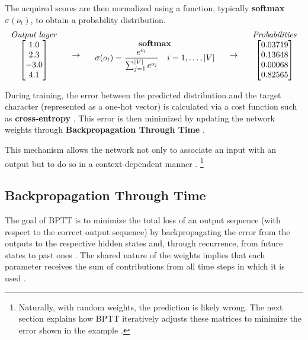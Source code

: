 The acquired scores are then normalized using a function, typically \textbf{softmax} $\sigma(o_t)$, to obtain a probability distribution. 
\[
\begin{array}{c}
\text{\textit{Output layer}} \\
\begin{bmatrix} 1.0 \\ 2.3 \\ -3.0 \\ 4.1 \end{bmatrix}
\end{array}
\quad \rightarrow \quad
\begin{array}{c}
\text{\textbf{softmax}} \\
\sigma(o_t) = \displaystyle\frac{e^{o_{i}}}{\sum_{j=1}^{|V|} e^{o_{j}}} \quad i = 1,\dots,|V|
\end{array}
\quad \rightarrow \quad
\begin{array}{c}
\text{\textit{Probabilities}} \\
\begin{bmatrix} 0.03719 \\ 0.13648 \\ 0.00068 \\ 0.82565 \end{bmatrix}
\end{array}
\]

During training, the error between the predicted distribution and the target character (represented as a one-hot vector) is calculated via a cost function such as \textbf{cross-entropy} \cite{cs231n-rnn, quarkml-bptt}. This error is then minimized by updating the network weights through \textbf{Backpropagation Through Time} \cite{quarkml-bptt, cs231n-rnn}.

This mechanism allows the network not only to associate an input with an output but to do so in a context-dependent manner \cite{cs231n-rnn}. \footnote{Naturally, with random weights, the prediction is likely wrong. The next section explains how BPTT iteratively adjusts these matrices to minimize the error shown in the example \cite{quarkml-bptt}.}%
\bigskip

\subsection{Backpropagation Through Time}
The goal of BPTT is to minimize the total loss of an output sequence (with respect to the correct output sequence) by backpropagating the error from the outputs to the respective hidden states and, through recurrence, from future states to past ones \cite{quarkml-bptt}. The shared nature of the weights implies that each parameter receives the sum of contributions from all time steps in which it is used \cite{quarkml-bptt}.

